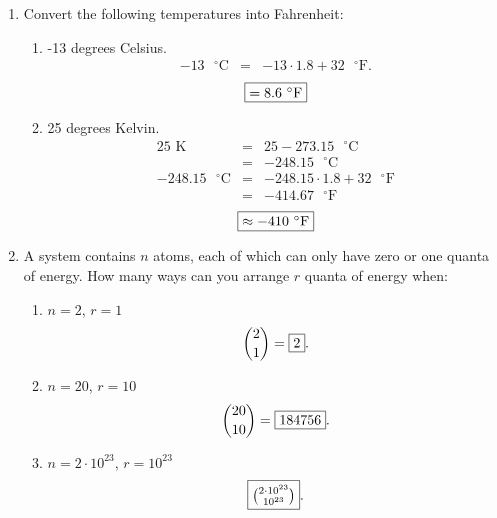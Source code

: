 \documentclass[12pt]{article}
\begin{document}
\begin{enumerate}
    \item Convert the following temperatures into Fahrenheit:
    \begin{enumerate}
        \item -13 degrees Celsius.
        \begin{eqnarray*}
			-13\mbox{ $^{ \circ}$C} &=& -13 \cdot 1.8 + 32 \mbox{ $^{ \circ}$F}.
		\end{eqnarray*}
		$$\fbox{$= 8.6 \mbox{ $^{ \circ}$F}$}$$
        \item 25 degrees Kelvin.
        \begin{eqnarray*}
        	25 \mbox{ K} &=& 25 - 273.15 \mbox{ $^{ \circ}$C}\\
        	&=& -248.15 \mbox{ $^{ \circ}$C}\\
        	-248.15 \mbox{ $^{ \circ}$C} &=& -248.15 \cdot 1.8 + 32 \mbox{ $^{ \circ}$F}\\
			&=& -414.67 \mbox{ $^{ \circ}$F}
		\end{eqnarray*}
		$$\fbox{$\approx -410 \mbox{ $^{ \circ}$F}$}$$
    \end{enumerate}
    
    \item A system contains $n$ atoms, each of which can only have zero or one quanta of energy. How many ways can you arrange $r$ quanta of energy when:
    \begin{enumerate}
        \item $n = 2$, $r = 1$
        	$${2 \choose 1} = \fbox{2}.$$
        \item $n = 20$, $r = 10$
        	$${20 \choose 10} = \fbox{184756}.$$
        \item $n = 2 \cdot 10^{23}$, $r = 10^{23}$
        	$$\fbox{${2 \cdot 10^{23} \choose 10^{23}}$}.$$
    \end{enumerate}
\end{enumerate}
\end{document}
